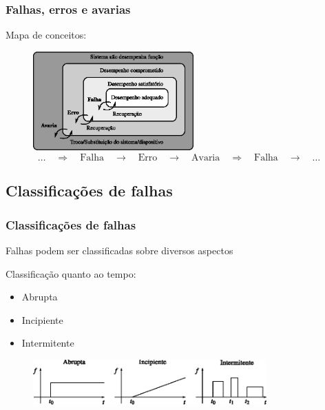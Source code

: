 \documentclass{beamer}
\begin{document}
\begin{frame}
    \frametitle{Falhas, erros e avarias}

    Mapa de conceitos:

\begin{figure}[htb]
\centering
    \includegraphics[width=0.55\textwidth]{imgs/detec_diag/eps/mapa_conceitos}
\[
\ldots
\quad\Longrightarrow\quad
\text{Falha} 
\quad\longrightarrow\quad
\text{Erro}
\quad\longrightarrow\quad
\text{Avaria}
\quad\Longrightarrow\quad
\text{Falha}
\quad\longrightarrow\quad
\ldots
\]
\end{figure}

\end{frame}

\subsection{Classificações de falhas}
\begin{frame}
    \frametitle{Classificações de falhas}

    Falhas podem ser classificadas sobre diversos aspectos

    \vspace{0.25cm}

    Classificação quanto ao tempo:

\begin{itemize}
    \item Abrupta
    \item Incipiente
    \item Intermitente
\end{itemize}

\begin{figure}[htb]
\centering
    \includegraphics[width=0.8\textwidth]{imgs/detec_diag/eps/tipos_falha}
\end{figure}
\end{frame}
\end{document}
